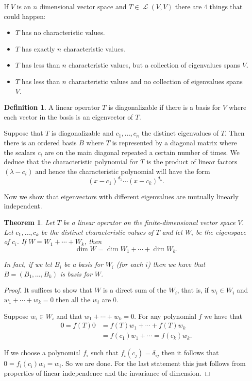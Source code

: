 \documentclass[12pt]{article}
\theoremstyle{plain}
\newtheorem{thm}{Theorem}
\theoremstyle{definition}
\newtheorem{defn}{Definition}
\newcommand{\Lop}{\operatorname{\mathcal{L}}}
\begin{document}
If $V$ is an $n$ dimensional vector space and $T \in \Lop(V, V)$ there are $4$ things that could happen:
\begin{itemize}
	\item $T$ has no characteristic values.
	\item $T$ has exactly $n$ characteristic values. 
	\item $T$ has less than $n$ characteristic values, but a collection of eigenvalues spans $V$.
	\item $T$ has less than $n$ characteristic values and no collection of eigenvalues spans $V$.
\end{itemize}

\begin{defn}
A linear operator $T$ is diagonalizable if there is a basis for $V$ where each vector in the basis is an eigenvector of $T$.
\end{defn}

Suppose that $T$ is diagonalizable and $c_1, \dotsc, c_n$ the distinct eigenvalues of $T$. Then there is an ordered basis $B$ where $T$ is represented by a diagonal matrix where the scalars $c_i$ are on the main diagonal repeated a certain number of times.
We deduce that the characteristic polynomial for $T$ is the product of linear factors $(\lambda - c_i)$ and hence the characteristic polynomial will have the form 
\[ (x - c_1)^{d_1}\cdots(x - c_k)^{d_k}.\]

Now we show that eigenvectors with different eigenvalues are mutually linearly independent.

\begin{thm}
Let $T$ be a linear operator on the finite-dimensional vector space $V$. Let $c_1,\dotsc,c_k$ be the distinct characteristic values of $T$ and let $W_i$ be the eigenspace of $c_i$. If $W = W_1 + \cdots + W_k$, then  
\[\dim{W} = \dim{W_1} + \cdots + \dim{W_k}.\]

In fact, if we let $B_i$ be a basis for $W_i$ (for each $i$) then we have that $B = (B_1, \dotsc, B_k)$ is basis for $W$.
\end{thm}

\begin{proof}
It suffices to show that $W$ is a direct sum of the $W_i$, that is, if $w_i \in W_i$ and $w_1 + \cdots + w_k = 0$ then all the $w_i$ are $0$.

Suppose $w_i \in W_i$ and that $w_1 + \cdots + w_k = 0$. For any polynomial $f$ we have that 
\begin{align*}
0 = f(T)0 &= f(T)w_1 + \cdots + f(T)w_k \\
	&= f(c_1)w_1 + \cdots = f(c_k)w_k.
\end{align*}

If we choose a polynomial $f_i$ such that $f_i(c_j) = \delta_{ij}$ then it follows that $0 = f_i(c_i)w_i = w_i$. So we are done. For the last statement this just follows from properties of linear independence and the invariance of dimension.
\end{proof}
\end{document}

